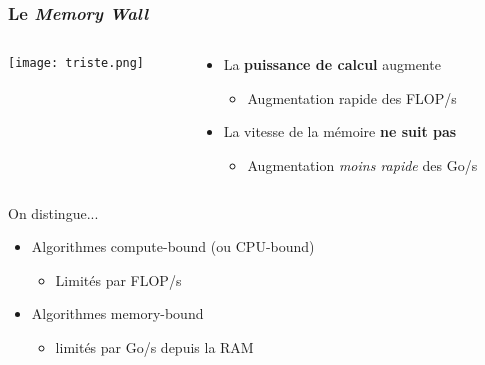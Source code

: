 \documentclass[xcolor={x11names,svgnames}]{beamer}
\begin{document}
\begin{frame}
  \frametitle{Le \og \emph{Memory Wall}\fg{}}

    \begin{columns}[c]
    \begin{column}{.1\textwidth}
      \texttt{[image: triste.png]}
    \end{column}
    \begin{column}{.9\textwidth}
      
  \begin{itemize}
  \item La \textbf{puissance de calcul} augmente
    \begin{itemize}
    \item Augmentation rapide des FLOP/s
    \end{itemize}

    \medskip
    
  \item La vitesse de la mémoire \textbf{ne suit pas}
        \begin{itemize}
    \item Augmentation \emph{moins rapide} des Go/s
    \end{itemize}
  \end{itemize}
\end{column}
\end{columns}

\bigskip

\begin{block}{On distingue...}
\begin{itemize}
\item Algorithmes \alert{compute-bound} {\small (ou CPU-bound)}
  \begin{itemize}
  \item Limités par FLOP/s
  \end{itemize}
  \medskip
  
\item Algorithmes \alert{memory-bound}
  \begin{itemize}
  \item  limités par Go/s depuis la RAM
  \end{itemize}
\end{itemize}
\end{block}

\end{frame}

\end{document}
